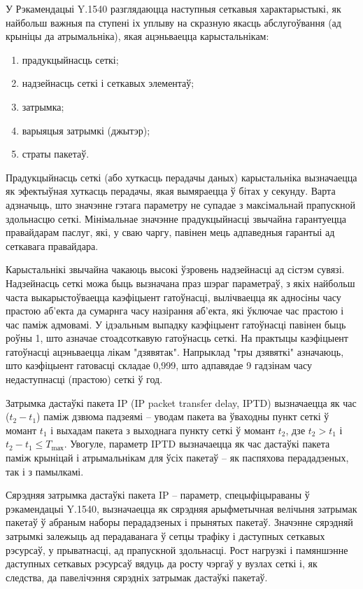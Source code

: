 У Рэкамендацыі Y.1540 разглядаюцца наступныя сеткавыя характарыстыкі, як найбольш важныя па ступені іх уплыву на скразную якасць абслугоўвання (ад крыніцы да атрымальніка), якая ацэньваецца карыстальнікам:
\begin{enumerate}
    \item прадукцыйнасць сеткі;
    \item надзейнасць сеткі і сеткавых элементаў;
    \item затрымка;
    \item варыяцыя затрымкі (джытэр);
    \item страты пакетаў.
\end{enumerate}

Прадукцыйнасць сеткі (або хуткасць перадачы даных) карыстальніка вызначаецца як эфектыўная хуткасць перадачы, якая вымяраецца ў бітах у секунду. Варта адзначыць, што значэнне гэтага параметру не супадае з максімальнай прапускной здольнасцю сеткі. Мінімальнае значэнне прадукцыйнасці звычайна гарантуецца правайдарам паслуг, які, у сваю чаргу, павінен мець адпаведныя гарантыі ад сеткавага правайдара.

Карыстальнікі звычайна чакаюць высокі ўзровень надзейнасці ад сістэм сувязі. Надзейнасць сеткі можа быць вызначана праз шэраг параметраў, з якіх найбольш часта выкарыстоўваецца каэфіцыент гатоўнасці, вылічваецца як адносіны часу прастою аб'екта да сумарнга часу назірання аб'екта, які ўключае час прастою і час паміж адмовамі. У ідэальным выпадку каэфіцыент гатоўнасці павінен быць роўны 1, што азначае стоадсоткавую гатоўнасць сеткі. На практыцы каэфіцыент гатоўнасці ацэньваецца лікам "дзявятак". Напрыклад "тры дзявяткі" азначаюць, што каэфіцыент гатовасці складае 0,999, што адпавядае 9 гадзінам часу недаступнасці (прастою) сеткі ў год.

Затрымка дастаўкі пакета IP (IP packet transfer delay, IPTD) вызначаецца як час ($t_2 - t_1$) паміж дзвюма падзеямі -- уводам пакета ва ўваходны пункт сеткі ў момант $t_1$ і выхадам пакета з выходнага пункту сеткі ў момант $t_2$, дзе $t_2 > t_1$ і $t_2 - t_1 \le T_\text{mах}$. Увогуле, параметр IPTD вызначаецца як час дастаўкі пакета паміж крыніцай і атрымальнікам для ўсіх пакетаў -- як паспяхова перададзеных, так і з памылкамі.

Сярэдняя затрымка дастаўкі пакета IP -- параметр, спецыфіцыраваны ў рэкамендацыі Y.1540, вызначаецца як сярэдняя арыфметычная велічыня затрымак пакетаў ў абраным наборы перададзеных і прынятых пакетаў. Значэнне сярэдняй затрымкі залежыць ад перадаванага ў сетцы трафіку і даступных сеткавых рэсурсаў, у прыватнасці, ад прапускной здольнасці. Рост нагрузкі і памяншэнне даступных сеткавых рэсурсаў вядуць да росту чэргаў у вузлах сеткі і, як следства, да павелічэння сярэдніх затрымак дастаўкі пакетаў.

